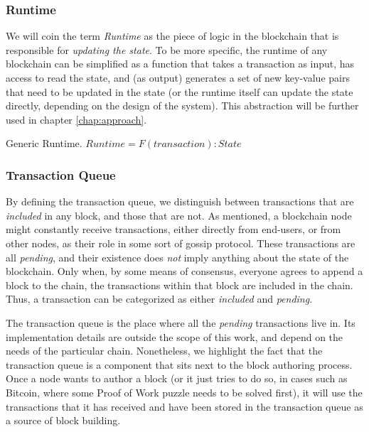 \subsubsection{Runtime} \label{chap_bg:subsec:runtime}


We will coin the term \textit{Runtime} as the piece of logic in the blockchain that is responsible
for \textit{updating the state}. To be more specific, the runtime of any blockchain can be
simplified as a function that takes a transaction as input, has access to read the state, and (as
output) generates a set of new key-value pairs that need to be updated in the state (or the runtime
itself can update the state directly, depending on the design of the system). This abstraction will
be further used in chapter \ref{chap:approach}.

\begin{definition} Generic Runtime.
	$Runtime = F(transaction): State$
\end{definition}

\subsubsection{Transaction Queue} \label{chap_bg:subsec:tx_queue}

By defining the transaction queue, we distinguish between transactions that are \textit{included} in
any block, and those that are not. As mentioned, a blockchain node might constantly receive
transactions, either directly from end-users, or from other nodes, as their role in some sort of
gossip protocol. These transactions are all \textit{pending}, and their existence does \textit{not}
imply anything about the state of the blockchain. Only when, by some means of consensus, everyone
agrees to append a block to the chain, the transactions within that block are included in the chain.
Thus, a transaction can be categorized as either \textit{included} and \textit{pending}.

The transaction queue is the place where all the \textit{pending} transactions live in. Its
implementation details are outside the scope of this work, and depend on the needs of the particular
chain. Nonetheless, we highlight the fact that the transaction queue is a component that sits next
to the block authoring process. Once a node wants to author a block (or it just tries to do so, in
cases such as Bitcoin, where some Proof of Work puzzle needs to be solved first), it will use the
transactions that it has received and have been stored in the transaction queue as a source of block
building.

